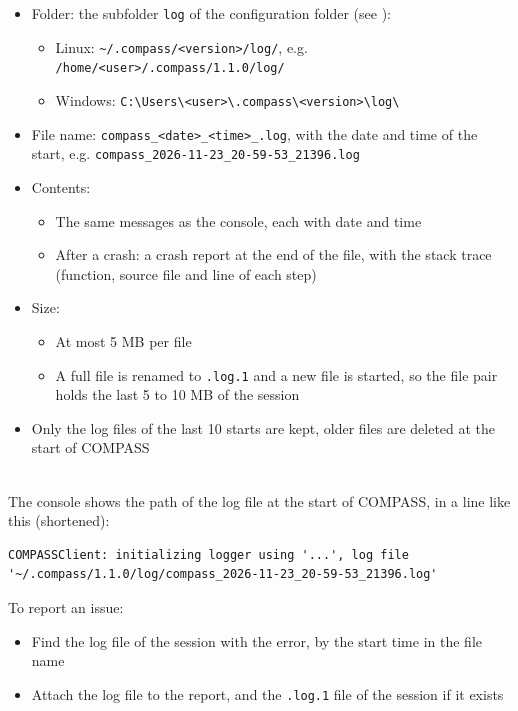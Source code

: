 \begin{itemize}
\item Folder: the subfolder \texttt{log} of the configuration folder (see ):
\begin{itemize}
\item Linux: \texttt{\textasciitilde/.compass/<version>/log/}, e.g. \texttt{/home/<user>/.compass/1.1.0/log/}
\item Windows: \texttt{C:\textbackslash Users\textbackslash <user>\textbackslash .compass\textbackslash <version>\textbackslash log\textbackslash}
\end{itemize}
\item File name: \texttt{compass\_<date>\_<time>\_<process id>.log}, with the date and time of the start, e.g. \texttt{compass\_2026-11-23\_20-59-53\_21396.log}
\item Contents:
\begin{itemize}
\item The same messages as the console, each with date and time
\item After a crash: a crash report at the end of the file, with the stack trace (function, source file and line of each step)
\end{itemize}
\item Size:
\begin{itemize}
\item At most 5 MB per file
\item A full file is renamed to \texttt{.log.1} and a new file is started, so the file pair holds the last 5 to 10 MB of the session
\end{itemize}
\item Only the log files of the last 10 starts are kept, older files are deleted at the start of COMPASS
\end{itemize}
\ \\

The console shows the path of the log file at the start of COMPASS, in a line like this (shortened):
\begin{verbatim}
COMPASSClient: initializing logger using '...', log file
'~/.compass/1.1.0/log/compass_2026-11-23_20-59-53_21396.log'
\end{verbatim}

To report an issue:
\begin{itemize}
\item Find the log file of the session with the error, by the start time in the file name
\item Attach the log file to the report, and the \texttt{.log.1} file of the session if it exists
\end{itemize}
\ \\

